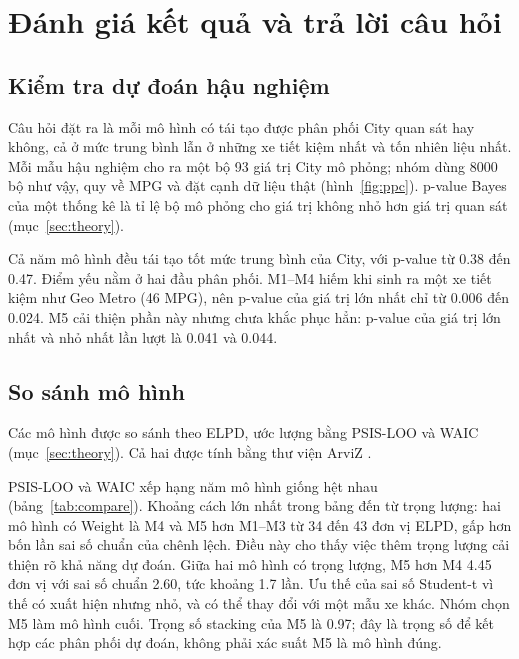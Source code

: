 \documentclass[12pt,a4paper]{report}
\begin{document}
\chapter{Đánh giá kết quả và trả lời câu hỏi}
\label{sec:evaluation}

\section{Kiểm tra dự đoán hậu nghiệm}

Câu hỏi đặt ra là mỗi mô hình có tái tạo được phân phối City quan sát hay
không, cả ở mức trung bình lẫn ở những xe tiết kiệm nhất và tốn nhiên liệu nhất.
Mỗi mẫu hậu nghiệm cho ra một bộ 93 giá trị City mô phỏng; nhóm dùng
\num{8000} bộ như vậy, quy về MPG và đặt cạnh dữ liệu thật
(hình~\ref{fig:ppc}). p-value Bayes của một thống kê là tỉ lệ bộ mô phỏng cho
giá trị không nhỏ hơn giá trị quan sát (mục~\ref{sec:theory}).

Cả năm mô hình đều tái tạo tốt mức trung bình của City, với p-value từ
\num{0.38} đến \num{0.47}. Điểm yếu nằm ở hai đầu phân phối. M1--M4 hiếm khi
sinh ra một xe tiết kiệm như Geo Metro (46 MPG), nên p-value của giá trị lớn
nhất chỉ từ \num{0.006} đến \num{0.024}. M5 cải thiện phần này nhưng chưa khắc
phục hẳn: p-value của giá trị lớn nhất và nhỏ nhất lần lượt là \num{0.041} và
\num{0.044}.


\section{So sánh mô hình}
\label{sec:compare}

Các mô hình được so sánh theo ELPD, ước lượng bằng PSIS-LOO và WAIC
(mục~\ref{sec:theory}). Cả hai được tính bằng thư viện ArviZ
\cite{kumar2019arviz}.

PSIS-LOO và WAIC xếp hạng năm mô hình giống hệt nhau (bảng~\ref{tab:compare}).
Khoảng cách lớn nhất trong bảng đến từ trọng lượng: hai mô hình có Weight là M4
và M5 hơn M1--M3 từ 34 đến 43 đơn vị ELPD, gấp hơn bốn lần sai số chuẩn của
chênh lệch. Điều này cho thấy việc thêm trọng lượng cải thiện rõ khả năng dự
đoán. Giữa hai mô hình có trọng lượng, M5 hơn M4 \num{4.45} đơn vị với sai số
chuẩn \num{2.60}, tức khoảng \num{1.7} lần. Ưu thế của sai số Student-t vì thế
có xuất hiện nhưng nhỏ, và có thể thay đổi với một mẫu xe khác. Nhóm chọn M5
làm mô hình cuối. Trọng số stacking của M5 là \num{0.97}; đây là trọng số để
kết hợp các phân phối dự đoán, không phải xác suất M5 là mô hình đúng.
\end{document}
